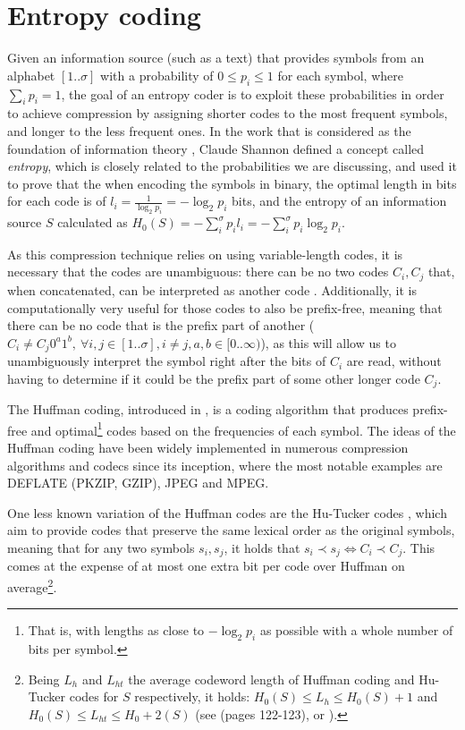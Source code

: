 \documentclass[a4paper,10pt,twoside]{book}
\begin{document}
	\section{Entropy coding}
	Given an information source (such as a text) that provides symbols from an alphabet $[1..\sigma]$ with a probability of $0 \leq p_i \leq 1$ for each symbol, where $\displaystyle\sum_ip_i=1$, the goal of an entropy coder is to exploit these probabilities in order to achieve compression by assigning shorter codes to the most frequent symbols, and longer to the less frequent ones. In the work that is considered as the foundation of information theory \cite{shannon1948mathematical}, Claude Shannon defined a concept called \textit{entropy}, which is closely related to the probabilities we are discussing, and used it to prove that the when encoding the symbols in binary, the optimal length in bits for each code is of $l_i = \frac{1}{\log_2p_i} = -\log_2p_i$ bits, and the entropy of an information source $S$ calculated as $H_0(S) = -\displaystyle\sum^\sigma_i p_il_i = -\displaystyle\sum^\sigma_i p_i\log_2p_i$.
	
	As this compression technique relies on using variable-length codes, it is necessary that the codes are unambiguous: there can be no two codes $C_i, C_j$ that, when concatenated, can be interpreted as another code 
	. Additionally, it is computationally very useful for those codes to also be prefix-free, meaning that there can be no code that is the prefix part of another ($C_i \neq C_j0^a1^b,~\forall i,j \in [1..\sigma], i\neq j, a,b \in [0..\infty)$), as this will allow us to unambiguously interpret the symbol right after the bits of $C_i$ are read, without having to determine if it could be the prefix part of some other longer code $C_j$.
	
	The Huffman coding, introduced in \cite{huffman1952method}, is a coding algorithm that produces prefix-free and optimal\footnote{That is, with lengths as close to $-\log_2p_i$ as possible with a whole number of bits per symbol.} codes based on the frequencies of each symbol. The ideas of the Huffman coding have been widely implemented in numerous compression algorithms and codecs since its inception, where the most notable examples are DEFLATE (PKZIP, GZIP), JPEG and MPEG.
	
	One less known variation of the Huffman codes are the Hu-Tucker codes \cite{hu1971optimal}, which aim to provide codes that preserve the same lexical order as the original symbols, meaning that for any two symbols $s_i,s_j$, it holds that $s_i \prec s_j \iff C_i \prec C_j$. This comes at the expense of at most one extra bit per code over Huffman on average\footnote{Being $L_h$ and $L_{ht}$ the average codeword 
	length of Huffman coding and Hu-Tucker codes for $S$ respectively, it holds: $H_0(S) \leq L_h \leq H_0(S)+1$ and $H_0(S) \leq L_{ht} \leq H_0+2(S)$
	(see \cite{Cover:2006:EIT:1146355} (pages 122-123), or \cite{HORIBE1977148, GilbertandMore1959}).}.
	
\end{document}

